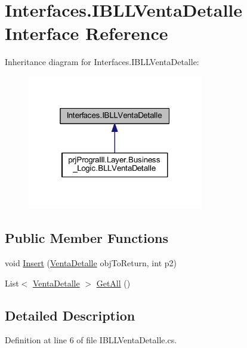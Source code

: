 \hypertarget{interface_interfaces_1_1_i_b_l_l_venta_detalle}{}\section{Interfaces.\+I\+B\+L\+L\+Venta\+Detalle Interface Reference}
\label{interface_interfaces_1_1_i_b_l_l_venta_detalle}


Inheritance diagram for Interfaces.\+I\+B\+L\+L\+Venta\+Detalle\+:
\nopagebreak
\begin{figure}[H]
\begin{center}
\leavevmode
\includegraphics[width=217pt]{interface_interfaces_1_1_i_b_l_l_venta_detalle__inherit__graph}
\end{center}
\end{figure}
\subsection*{Public Member Functions}
\begin{DoxyCompactItemize}
\item 
void \hyperlink{interface_interfaces_1_1_i_b_l_l_venta_detalle_a3025cdae5e97d2097996fec8f11de409}{Insert} (\hyperlink{classprj_progra_i_i_i_1_1_layer_1_1_entities_1_1_venta_detalle}{Venta\+Detalle} obj\+To\+Return, int p2)
\item 
List$<$ \hyperlink{classprj_progra_i_i_i_1_1_layer_1_1_entities_1_1_venta_detalle}{Venta\+Detalle} $>$ \hyperlink{interface_interfaces_1_1_i_b_l_l_venta_detalle_af009e6d0db3ad9f1adf7ea8e00efc7f6}{Get\+All} ()
\end{DoxyCompactItemize}


\subsection{Detailed Description}


Definition at line 6 of file I\+B\+L\+L\+Venta\+Detalle.\+cs.



